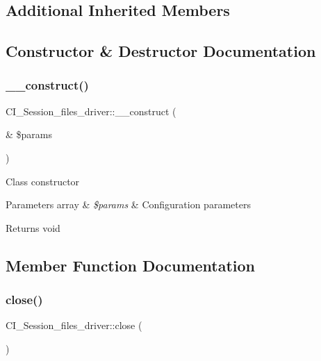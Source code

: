 \subsection*{Additional Inherited Members}


\subsection{Constructor \& Destructor Documentation}
\mbox{\label{class_c_i___session__files__driver_a3696fdd1e0a652209438d79569935332}} 
\subsubsection{\texorpdfstring{\+\_\+\+\_\+construct()}{\_\_construct()}}
{\footnotesize\ttfamily C\+I\+\_\+\+Session\+\_\+files\+\_\+driver\+::\+\_\+\+\_\+construct (\begin{DoxyParamCaption}\item[{\&}]{\$params }\end{DoxyParamCaption})}

Class constructor


\begin{DoxyParams}[1]{Parameters}
array & {\em \$params} & Configuration parameters \\
\hline
\end{DoxyParams}
\begin{DoxyReturn}{Returns}
void 
\end{DoxyReturn}


\subsection{Member Function Documentation}
\mbox{\label{class_c_i___session__files__driver_a3a6ae13966e0721deb3d519f3dd29c32}} 
\subsubsection{\texorpdfstring{close()}{close()}}
{\footnotesize\ttfamily C\+I\+\_\+\+Session\+\_\+files\+\_\+driver\+::close (\begin{DoxyParamCaption}{ }\end{DoxyParamCaption})}

